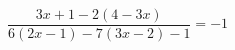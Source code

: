 \begin{ex}[type=equation]
	\begin{condition}
		$\dfrac{3x + 1-2(4 - 3x)}{6(2x - 1)-7(3x - 2) - 1} = -1$
	\end{condition}
\end{ex}